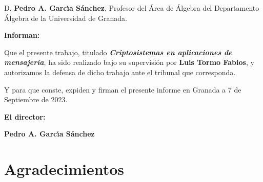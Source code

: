 D. \textbf{Pedro A. Garcı́a Sánchez}, Profesor del Área de Álgebra del Departamento Álgebra de la Universidad de Granada.

\vspace{0.5cm}

\textbf{Informan:}

\vspace{0.5cm}

Que el presente trabajo, titulado \textit{\textbf{Criptosistemas en aplicaciones de mensajería}},
ha sido realizado bajo su supervisión por \textbf{Luis Tormo Fabios}, y autorizamos la defensa de dicho trabajo ante el tribunal
que corresponda.

\vspace{0.5cm}

Y para que conste, expiden y firman el presente informe en Granada a 7 de Septiembre de 2023.

\vspace{1cm}

\textbf{El director:}

\vspace{5cm}

\noindent \textbf{Pedro A. Garcı́a Sánchez}

\chapter*{Agradecimientos}
\thispagestyle{empty}

       \vspace{1cm}


